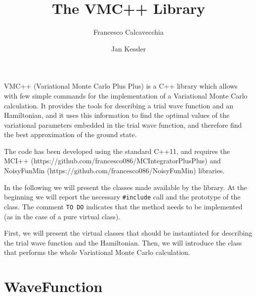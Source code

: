 \documentclass[11pt,a4paper,twoside]{article}
\title{The VMC++ Library}
\author{Francesco Calcavecchia \and Jan Kessler}
\begin{document}
\maketitle

VMC++ (Variational Monte Carlo Plus Plus) is a C++ library which allows with few simple commands for the implementation of a Variational Monte Carlo calculation.
It provides the tools for describing a trial wave function and an Hamiltonian, and it uses this information to find the optimal values of the variational parameters embedded in the trial wave function, and therefore find the best approximation of the ground state.

The code has been developed using the standard C++11, and requires the MCI++ (https://github.com/francesco086/MCIntegratorPlusPlus) and NoisyFunMin (https://github.com/francesco086/NoisyFunMin) libraries.

In the following we will present the classes made available by the library.
At the beginning we will report the necessary \verb+#include+ call and the prototype of the class.
The comment \verb+TO DO+ indicates that the method needs to be implemented (as in the case of a pure virtual class).

First, we will present the virtual classes that should be instantiated for describing the trial wave function and the Hamiltonian.
Then, we will introduce the class that performs the whole Variational Monte Carlo calculation.


\section{WaveFunction} %
\label{sec:wave_function}
\end{document}

